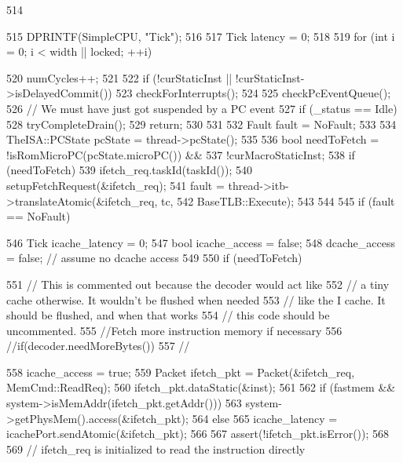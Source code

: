 \begin{DoxyCode}
514 {
515     DPRINTF(SimpleCPU, "Tick\n");
516 
517     Tick latency = 0;
518 
519     for (int i = 0; i < width || locked; ++i) {
520         numCycles++;
521 
522         if (!curStaticInst || !curStaticInst->isDelayedCommit())
523             checkForInterrupts();
524 
525         checkPcEventQueue();
526         // We must have just got suspended by a PC event
527         if (_status == Idle) {
528             tryCompleteDrain();
529             return;
530         }
531 
532         Fault fault = NoFault;
533 
534         TheISA::PCState pcState = thread->pcState();
535 
536         bool needToFetch = !isRomMicroPC(pcState.microPC()) &&
537                            !curMacroStaticInst;
538         if (needToFetch) {
539             ifetch_req.taskId(taskId());
540             setupFetchRequest(&ifetch_req);
541             fault = thread->itb->translateAtomic(&ifetch_req, tc,
542                                                  BaseTLB::Execute);
543         }
544 
545         if (fault == NoFault) {
546             Tick icache_latency = 0;
547             bool icache_access = false;
548             dcache_access = false; // assume no dcache access
549 
550             if (needToFetch) {
551                 // This is commented out because the decoder would act like
552                 // a tiny cache otherwise. It wouldn't be flushed when needed
553                 // like the I cache. It should be flushed, and when that works
554                 // this code should be uncommented.
555                 //Fetch more instruction memory if necessary
556                 //if(decoder.needMoreBytes())
557                 //{
558                     icache_access = true;
559                     Packet ifetch_pkt = Packet(&ifetch_req, MemCmd::ReadReq);
560                     ifetch_pkt.dataStatic(&inst);
561 
562                     if (fastmem && system->isMemAddr(ifetch_pkt.getAddr()))
563                         system->getPhysMem().access(&ifetch_pkt);
564                     else
565                         icache_latency = icachePort.sendAtomic(&ifetch_pkt);
566 
567                     assert(!ifetch_pkt.isError());
568 
569                     // ifetch_req is initialized to read the instruction directly
      
}}}}}
\end{DoxyCode}
